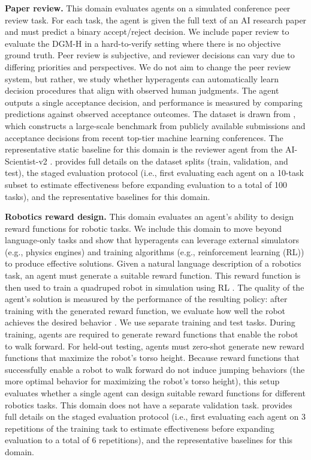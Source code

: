 \documentclass[]{fairmeta}
\begin{document}
\textbf{Paper review.}
This domain evaluates agents on a simulated conference peer review task. For each task, the agent is given the full text of an AI research paper and must predict a binary accept/reject decision. We include paper review to evaluate the DGM-H in a hard-to-verify setting where there is no objective ground truth. Peer review is subjective, and reviewer decisions can vary due to differing priorities and perspectives. We do not aim to change the peer review system, but rather, we study whether hyperagents can automatically learn decision procedures that align with observed human judgments. The agent outputs a single acceptance decision, and performance is measured by comparing predictions against observed acceptance outcomes. The dataset is drawn from \citet{zhao2026apres}, which constructs a large-scale benchmark from publicly available submissions and acceptance decisions from recent top-tier machine learning conferences. The representative static baseline for this domain is the reviewer agent from the AI-Scientist-v2 \citep{yamada2025ai}.  provides full details on the dataset splits (train, validation, and test), the staged evaluation protocol (i.e., first evaluating each agent on a 10-task subset to estimate effectiveness before expanding evaluation to a total of 100 tasks), and the representative baselines for this domain.

\textbf{Robotics reward design.}
This domain evaluates an agent's ability to design reward functions for robotic tasks. We include this domain to move beyond language-only tasks and show that hyperagents can leverage external simulators (e.g., physics engines) and training algorithms (e.g., reinforcement learning (RL)) to produce effective solutions. Given a natural language description of a robotics task, an agent must generate a suitable reward function. This reward function is then used to train a quadruped robot in simulation using RL \citep{genesis2024}. The quality of the agent's solution is measured by the performance of the resulting policy: after training with the generated reward function, we evaluate how well the robot achieves the desired behavior \citep{maeureka}. We use separate training and test tasks. During training, agents are required to generate reward functions that enable the robot to walk forward. For held-out testing, agents must zero-shot generate new reward functions that maximize the robot's torso height. Because reward functions that successfully enable a robot to walk forward do not induce jumping behaviors (the more optimal behavior for maximizing the robot's torso height), this setup evaluates whether a single agent can design suitable reward functions for different robotics tasks. This domain does not have a separate validation task.  provides full details on the staged evaluation protocol (i.e., first evaluating each agent on 3 repetitions of the training task to estimate effectiveness before expanding evaluation to a total of 6 repetitions), and the representative baselines for this domain.
\end{document}
